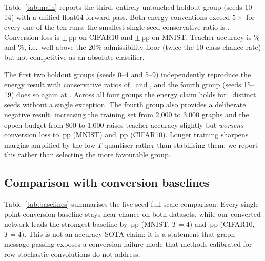 Table~\ref{tab:main} reports the third, entirely untouched holdout group (seeds 10--14) with a unified float64 forward pass. Both energy conventions exceed $5\times$ for every one of the ten runs; the smallest single-seed conservative ratio is \MinCons. Conversion loss is \CIFARLoss$\pm$\CIFARLossStd\,pp on CIFAR10 and \MNISTLoss$\pm$\MNISTLossStd\,pp on MNIST. Teacher accuracy is \CIFARAnn\% and \MNISTAnn\%, i.e.\ well above the 20\% admissibility floor (twice the 10-class chance rate) but not competitive as an absolute classifier.

\begin{table}[t]
\centering
\caption{Five-seed results on untouched holdout seeds 10--14. Energy is a 45\,nm theoretical arithmetic estimate under two conventions; loss is conversion loss in percentage points (lower is better).}
\label{tab:main}

\end{table}

The first two holdout groups (seeds 0--4 and 5--9) independently reproduce the energy result with conservative ratios of \EarlierConsA\ and \EarlierConsB, and the fourth group (seeds 15--19) does so again at \FourthCons. Across all four groups the energy claim holds for \TotalSeeds\ distinct seeds without a single exception. The fourth group also provides a deliberate negative result: increasing the training set from 2,000 to 3,000 graphs and the epoch budget from 800 to 1,000 raises teacher accuracy slightly but \emph{worsens} conversion loss to \EIGHTEENMNISTLoss\,pp (MNIST) and \EIGHTEENCIFARLoss\,pp (CIFAR10). Longer training sharpens margins amplified by the low-$T$ quantiser rather than stabilising them; we report this rather than selecting the more favourable group.

\subsection{Comparison with conversion baselines}
\label{ssec:comparison}

Table~\ref{tab:baselines} summarises the five-seed full-scale comparison. Every single-point conversion baseline stays near chance on both datasets, while our converted network leads the strongest baseline by \MarginMNIST\,pp (MNIST, $T{=}4$) and \MarginCIFAR\,pp (CIFAR10, $T{=}4$). This is not an accuracy-SOTA claim: it is a statement that graph message passing exposes a conversion failure mode that methods calibrated for row-stochastic convolutions do not address.

\begin{table}[t]
\centering
\caption{Five-seed top-1 (\%) at $T{=}4$ and $T{=}8$ for all adapted conversion baselines. Chance is 10\%.}
\label{tab:baselines}

\end{table}

